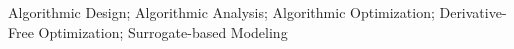 \noindent Algorithmic Design; Algorithmic Analysis; Algorithmic Optimization; Derivative-Free Optimization; Surrogate-based Modeling